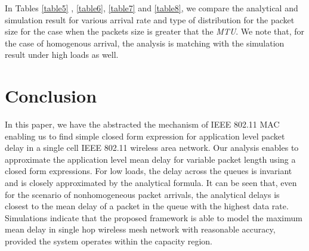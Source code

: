\documentclass[10pt, conference, compsocconf]{IEEEtran}
\begin{document}
In Tables \ref{table5} , \ref{table6}, \ref{table7} and \ref{table8}, we compare the analytical and simulation result for various arrival rate and type of distribution for the packet size for the case when the packets size is greater that the \textit{MTU}. We note that, for the case of homogenous arrival, the analysis is matching with the simulation result  under high loads as well.

\section{\large{Conclusion}}
In this paper, we have the abstracted the mechanism of IEEE 802.11 MAC enabling us to find simple closed form expression for application level packet delay in a single cell IEEE 802.11 wireless area network. Our analysis enables to approximate the application level mean delay for variable packet length using a closed form expressions. For low loads, the delay across the queues is invariant and is closely approximated by the analytical formula. It can be seen that, even for the scenario of nonhomogeneous packet arrivals, the analytical delays is closest to the mean delay of a packet in the queue with the highest data rate. Simulations indicate that the proposed framework is able to model the maximum mean delay in single hop wireless mesh network with reasonable accuracy, provided the system operates within the capacity region. 





\end{document}
